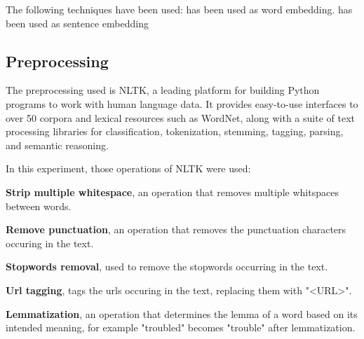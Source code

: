 \documentclass[12pt, a4paper]{article}
\begin{document}
\hfill\break
\hfill\break

The following techniques have been used:
has been used as word embedding.
has been used as sentence embedding
\hfill\break

\subsection{Preprocessing}\label{subsec:preprocessing}
The preprocessing used is NLTK, a leading platform for building Python programs to work with human language data.
It provides easy-to-use interfaces to over 50 corpora and lexical resources such as WordNet,
along with a suite of text processing libraries for classification, tokenization, stemming, tagging, parsing,
and semantic reasoning.

\hfill\break
In this experiment, those operations of NLTK were used:

\textbf{Strip multiple whitespace}, an operation that removes multiple whitspaces between words.


\textbf{Remove punctuation}, an operation that removes the punctuation characters occuring in the text.


\textbf{Stopwords removal}, used to remove the stopwords occurring in the text.


\textbf{Url tagging}, tags the urls occuring in the text, replacing them with "<URL>".


\textbf{Lemmatization}, an operation that determines the lemma of a word based on its intended meaning, for example "troubled" becomes "trouble" after lemmatization.
\end{document}
